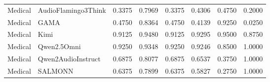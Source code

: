 \begin{table}
\begin{tabular}{llllllll}
Medical & AudioFlamingo3Think & 0.3375 & 0.7969 & 0.3375 & 0.4306 & 0.4750 & 0.2000 \\
Medical & GAMA & 0.4750 & 0.8364 & 0.4750 & 0.4139 & 0.9250 & 0.0250 \\
Medical & Kimi & 0.9125 & 0.9480 & 0.9125 & 0.9295 & 0.9500 & 0.8750 \\
Medical & Qwen2.5Omni & 0.9250 & 0.9348 & 0.9250 & 0.9246 & 0.8500 & 1.0000 \\
Medical & Qwen2AudioInstruct & 0.6875 & 0.8077 & 0.6875 & 0.6537 & 0.3750 & 1.0000 \\
Medical & SALMONN & 0.6375 & 0.7899 & 0.6375 & 0.5827 & 0.2750 & 1.0000 \\
\bottomrule
\end{tabular}
\end{table}
